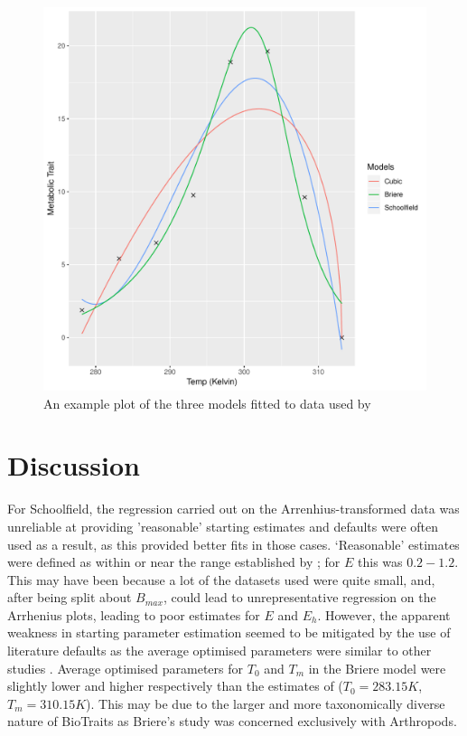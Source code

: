 \documentclass[twoside,twocolumn,11pt]{article}
\begin{document}
\begin{figure}
  \includegraphics[width=\textwidth]{../Results/MTD2099.pdf}
  \caption{An example plot of the three models fitted to data used by
  \citep{Li2009}}
\end{figure}



\section{Discussion}
For Schoolfield,
the regression carried out on the Arrenhius-transformed data was unreliable at providing 
'reasonable' starting estimates and defaults were often used as a result, as this provided
better fits in those cases. `Reasonable' estimates were defined as within or near the range established
by \cite{Dell2011}; for $E$ this was $0.2-1.2$. This may have been because a lot of the datasets used were quite small, and, after
being split about $B_{max}$, could lead to unrepresentative regression on the Arrhenius plots, leading to 
poor estimates for $E$ and
$E_h$. However, the apparent weakness in starting parameter estimation seemed to be mitigated
by the use of literature defaults as the average optimised parameters were similar to other studies 
\citep{Dell2011, Kontopoulos2018}. Average optimised parameters for $T_0$ and $T_m$ in the Briere model 
were slightly lower and higher respectively than the
estimates of \citep{Briere1999} ($T_0 = 283.15 K$, $T_m = 310.15 K$). This may be due to the larger and 
more taxonomically diverse nature of BioTraits as Briere's study was concerned exclusively 
with Arthropods. 
\end{document}
